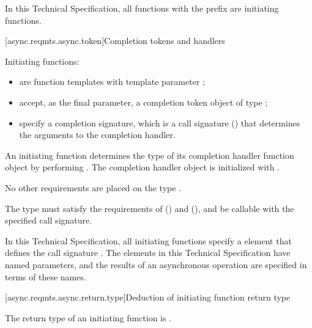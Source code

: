 \pnum
In this Technical Specification, all functions with the prefix  are initiating functions.



[async.reqmts.async.token]{Completion tokens and handlers}

%
\pnum
Initiating functions:

\begin{itemize}
\item
are function templates with template parameter ;

%
\item
accept, as the final parameter, a completion token object  of type ;

%
\item
specify a completion signature, which is a call signature ()  that determines the arguments to the completion handler.
\end{itemize}

%
\pnum
An initiating function determines the type  of its
completion handler function object by performing
.
The completion handler object  is initialized with
.
\begin{note} No other requirements are placed on the type . \end{note}

\pnum
The type  must satisfy the requirements of  () and  (), and be callable with the specified call signature.

\pnum
In this Technical Specification, all initiating functions specify a
\completionsig element that defines the call signature .
The \completionsig elements in this Technical Specification have named
parameters, and the results of an asynchronous operation are specified in
terms of these names.



[async.reqmts.async.return.type]{Deduction of initiating function return type}

%
\pnum
The return type of an initiating function is .

